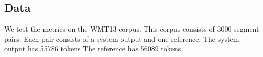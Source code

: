 

\subsection{Data}
\label{sec:data}

We test the metrics on the WMT13 corpus. 
This corpus consists of $3000$ segment pairs. 
Each pair consists of a system output and one reference. 
The system output has 55786 tokens
The reference has 56089 tokens. 



